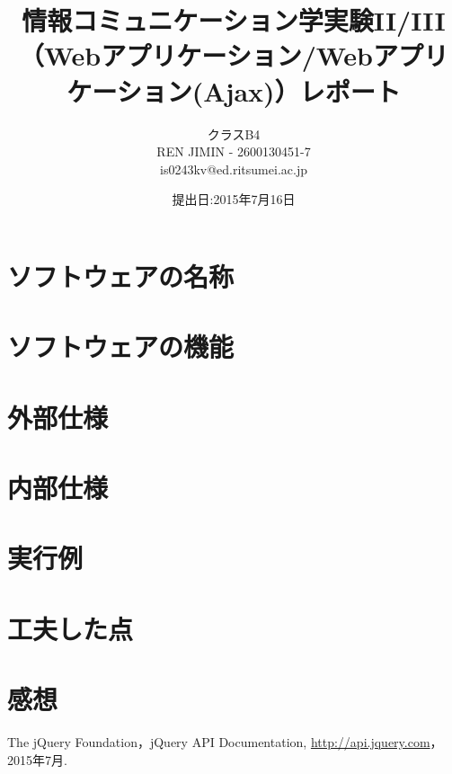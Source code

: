 \documentclass{jarticle}
\title{情報コミュニケーション学実験II/III\\%
（Webアプリケーション/Webアプリケーション(Ajax)）レポート}
\author{クラスB4\\REN JIMIN - 2600130451-7\\is0243kv@ed.ritsumei.ac.jp}
\date{提出日:2015年7月16日}
\begin{document}
\maketitle
\tableofcontents
\clearpage

\section{ソフトウェアの名称}
	
\section{ソフトウェアの機能}
	
\section{外部仕様}
	
\section{内部仕様}
	
\section{実行例}
	
\section{工夫した点}
	
\section{感想}
		
	

\begin{thebibliography}{1}

	 The jQuery Foundation，jQuery API Documentation,
	\url{http://api.jquery.com}，2015年7月.
\end{thebibliography}
\end{document}
